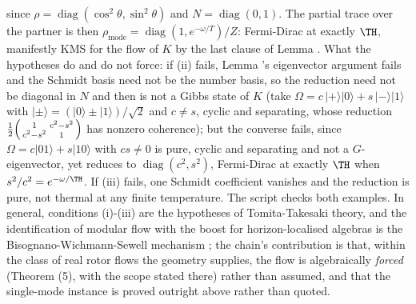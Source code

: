 since $\rho = \operatorname{diag}(\cos^2\theta, \sin^2\theta)$ and $N = \operatorname{diag}(0,1)$. The partial trace over the partner is then $\rho_{\text{mode}} = \operatorname{diag}(1, e^{-\omega/T})/Z$: Fermi-Dirac at exactly $\TH$, manifestly KMS for the flow of $K$ by the last clause of Lemma . What the hypotheses do and do not force: if (ii) fails, Lemma 's eigenvector argument fails and the Schmidt basis need not be the number basis, so the reduction need not be diagonal in $N$ and then is not a Gibbs state of $K$ (take $\Omega = c\,|{+}\rangle|0\rangle + s\,|{-}\rangle|1\rangle$ with $|{\pm}\rangle = (|0\rangle \pm |1\rangle)/\sqrt2$ and $c \neq s$, cyclic and separating, whose reduction $\tfrac12\begin{psmallmatrix} 1 & c^{2} - s^{2} \\ c^{2} - s^{2} & 1\end{psmallmatrix}$ has nonzero coherence); but the converse fails, since $\Omega = c|01\rangle + s|10\rangle$ with $cs \neq 0$ is pure, cyclic and separating and not a $G$-eigenvector, yet reduces to $\operatorname{diag}(c^{2}, s^{2})$, Fermi-Dirac at exactly $\TH$ when $s^{2}/c^{2} = e^{-\omega/\TH}$. If (iii) fails, one Schmidt coefficient vanishes and the reduction is pure, not thermal at any finite temperature. The script checks both examples. In general, conditions (i)-(iii) are the hypotheses of Tomita-Takesaki theory, and the identification of modular flow with the boost for horizon-localised algebras is the Bisognano-Wichmann-Sewell mechanism \cite{BW1976, Sewell1982}; the chain's contribution is that, within the class of real rotor flows the geometry supplies, the flow is algebraically \emph{forced} (Theorem (5), with the scope stated there) rather than assumed, and that the single-mode instance is proved outright above rather than quoted.
